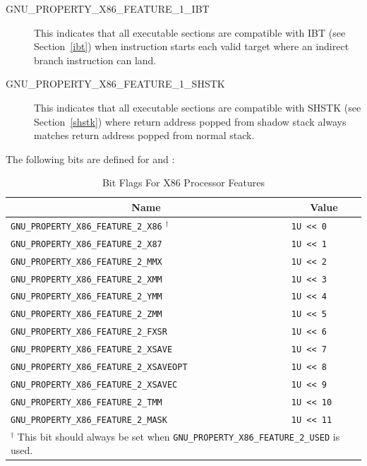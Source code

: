 \begin{description}
 \item[GNU_PROPERTY_X86_FEATURE_1_IBT] This indicates that all executable
   sections are compatible with IBT (see Section~\ref{ibt}) when
    instruction starts each valid target where an indirect
   branch instruction can land.
 \item[GNU_PROPERTY_X86_FEATURE_1_SHSTK] This indicates that all
   executable sections are compatible with SHSTK (see Section~\ref{shstk})
   where return address popped from shadow stack always matches return
   address popped from normal stack.
\end{description}

The following bits are defined for 
and :

\begin{table}[H]
\Hrule
  \caption{Bit Flags For X86 Processor Features}
  \begin{center}
    \begin{tabular}[t]{l|l}
      \multicolumn{1}{c}{Name} & \multicolumn{1}{c}{Value} \\
      \hline
     \texttt{GNU_PROPERTY_X86_FEATURE_2_X86} $^\dagger$ & \texttt{1U << 0} \\
     \texttt{GNU_PROPERTY_X86_FEATURE_2_X87} & \texttt{1U << 1} \\
     \texttt{GNU_PROPERTY_X86_FEATURE_2_MMX} & \texttt{1U << 2} \\
     \texttt{GNU_PROPERTY_X86_FEATURE_2_XMM} & \texttt{1U << 3} \\
     \texttt{GNU_PROPERTY_X86_FEATURE_2_YMM} & \texttt{1U << 4} \\
     \texttt{GNU_PROPERTY_X86_FEATURE_2_ZMM} & \texttt{1U << 5} \\
     \texttt{GNU_PROPERTY_X86_FEATURE_2_FXSR} & \texttt{1U << 6} \\
     \texttt{GNU_PROPERTY_X86_FEATURE_2_XSAVE} & \texttt{1U << 7} \\
     \texttt{GNU_PROPERTY_X86_FEATURE_2_XSAVEOPT} & \texttt{1U << 8} \\
     \texttt{GNU_PROPERTY_X86_FEATURE_2_XSAVEC} & \texttt{1U << 9} \\
     \texttt{GNU_PROPERTY_X86_FEATURE_2_TMM} & \texttt{1U << 10} \\
     \texttt{GNU_PROPERTY_X86_FEATURE_2_MASK} & \texttt{1U << 11} \\
    \cline{1-2}
    \multicolumn{2}{p{13cm}}{\small $^\dagger$ This bit should always
    be set when \texttt{GNU_PROPERTY_X86_FEATURE_2_USED} is used.}\\
    \end{tabular}
  \end{center}
\end{table}

